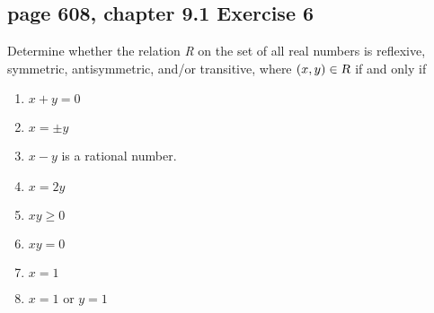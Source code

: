 \documentclass[sigconf]{acmart}
\begin{document}
\subsection{page 608, chapter 9.1 Exercise 6}
\begin{shaded}
    Determine whether the relation \textsl{R} on the set of all real numbers is reflexive, symmetric, antisymmetric, and/or transitive, where $(x, y) \in \textsl{R}$ if and only if
    \begin{enumerate}[label=(\alph*)]
        \item $x + y = 0$
        \item $x = \pm y$
        \item $x - y$ is a rational number.
        \item $x = 2y$
        \item $xy \geq 0$
        \item $xy = 0$
        \item $x = 1$
        \item $x = 1$ or $y = 1$
    \end{enumerate}
\end{shaded}
\end{document}
